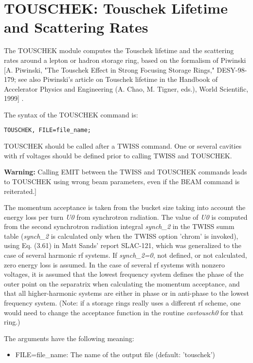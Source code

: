 
\chapter{TOUSCHEK: Touschek Lifetime and Scattering Rates}

The TOUSCHEK module computes the Touschek lifetime and the scattering rates 
around a lepton or hadron storage ring, based on the formalism of Piwinski [A. 
Piwinski, "The Touschek Effect in Strong Focusing Storage Rings," DESY-98-179; 
see also Piwinski's article on Touschek lifetime in the Handbook of Accelerator 
Physics and Engineering (A. Chao, M. Tigner, eds.), World Scientific, 1999] .

The syntax of the TOUSCHEK command is: 
\begin{verbatim}
TOUSCHEK, FILE=file_name;
\end{verbatim}

TOUSCHEK should be called after a TWISS command. One or several cavities 
with rf voltages should be defined prior to calling TWISS and TOUSCHEK. 

{\bf Warning:} Calling EMIT between the TWISS and TOUSCHEK commands
leads to TOUSCHEK using wrong beam parameters, even if the BEAM command
is reiterated.] 
 

The momentum acceptance is taken from the bucket size taking into
account the  energy loss per turn \textit{U0 }from synchrotron
radiation. The value of \textit{U0} is computed from the second
synchrotron radiation integral \textit{synch\_2} in the TWISS summ table
(\textit{synch\_2} is calculated only when the TWISS option 'chrom' is
invoked), using Eq. (3.61) in Matt Sands' report SLAC-121, which was
generalized to the case of several harmonic rf systems. If
\textit{synch\_2=0}, not defined, or not calculated, zero energy loss is
assumed. In the case of several rf systems with nonzero voltages, it is
assumed that the lowest frequency system defines the phase of the outer
point on the separatrix when calculating the momentum acceptance, and
that all higher-harmonic systems are either in phase or in anti-phase to
the lowest frequency system. (Note: if a storage rings really uses a
different rf scheme, one would need to change the acceptance function in
the routine \textit{cavtousch0} for that ring.) 

The arguments have the following meaning: 
\begin{itemize}
   \item FILE=file\_name: The name of the output file (default: 'touschek') 
\end{itemize}


